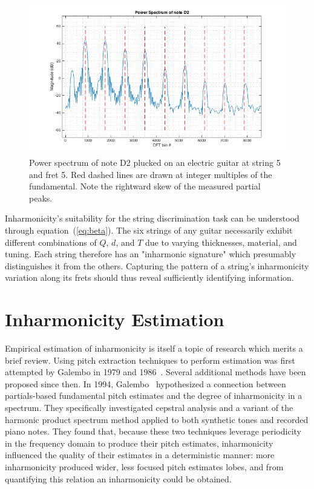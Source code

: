 \documentclass[12pt]{cmuthesis}
\begin{document}
\begin{figure}[!htbp]
\label{fig:skew}
\centering
\includegraphics[scale=0.65]{skew}
\caption{Power spectrum of note D2 plucked on an electric guitar at string 5 and fret 5. Red dashed lines are drawn at integer multiples of the fundamental. Note the rightward skew of the measured partial peaks.}
\end{figure}

Inharmonicity's suitability for the string discrimination task can be understood through equation~(\ref{eq:beta}). The six strings of any guitar necessarily exhibit different combinations of $Q$, $d$, and $T$ due to varying thicknesses, material, and tuning. Each string therefore has an "inharmonic signature" which presumably distinguishes it from the others. Capturing the pattern of a string's inharmonicity variation along its frets should thus reveal sufficiently identifying information.

\section{Inharmonicity Estimation}
\label{lit-beta-est}
Empirical estimation of inharmonicity is itself a topic of research which merits a brief review. Using pitch extraction techniques to perform estimation was first attempted by Galembo in 1979 and 1986~\cite{galembo1979,galembo1987}. Several additional methods have been proposed since then. In 1994, Galembo~\cite{galembo1994} hypothesized a connection between partials-based fundamental pitch estimates and the degree of inharmonicity in a spectrum. They specifically investigated cepstral analysis and a variant of the harmonic product spectrum method applied to both synthetic tones and recorded piano notes. They found that, because these two techniques leverage periodicity in the frequency domain to produce their pitch estimates, inharmonicity influenced the quality of their estimates in a deterministic manner: more inharmonicity produced wider, less focused pitch estimates lobes, and from quantifying this relation an inharmonicity could be obtained.
 
\end{document}
